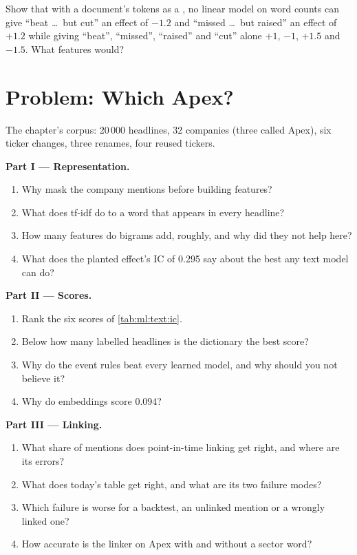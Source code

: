 \begin{exercise}[$\star\star\star$]\label{exo:ml:text-from-bag-of-words-to-embeddings:8}
Show that with a document's tokens as a , no linear model on word counts can give ``beat \dots\ but cut'' an
effect of $-1.2$ and ``missed \dots\ but raised'' an effect of $+1.2$ while giving ``beat'', ``missed'', ``raised'' and ``cut''
alone $+1$, $-1$, $+1.5$ and $-1.5$. What features would?
\end{exercise}

\section{Problem: Which Apex?}

\begin{problem}\label{pb:ml:text-from-bag-of-words-to-embeddings:1}
The chapter's corpus: 20\,000 headlines, 32 companies (three called Apex), six ticker changes, three renames, four reused
tickers.

\medskip\noindent\textbf{Part I --- Representation.}
\begin{enumerate}
\item Why mask the company mentions before building features?
\item What does tf-idf do to a word that appears in every headline?
\item How many features do bigrams add, roughly, and why did they not help here?
\item What does the planted effect's IC of 0.295 say about the best any text model can do?
\end{enumerate}

\medskip\noindent\textbf{Part II --- Scores.}
\begin{enumerate}[resume]
\item Rank the six scores of \cref{tab:ml:text:ic}.
\item Below how many labelled headlines is the dictionary the best score?
\item Why do the event rules beat every learned model, and why should you not believe it?
\item Why do embeddings score 0.094?
\end{enumerate}

\medskip\noindent\textbf{Part III --- Linking.}
\begin{enumerate}[resume]
\item What share of mentions does point-in-time linking get right, and where are its errors?
\item What does today's table get right, and what are its two failure modes?
\item Which failure is worse for a backtest, an unlinked mention or a wrongly linked one?
\item How accurate is the linker on Apex with and without a sector word?
\end{enumerate}


\end{problem}
